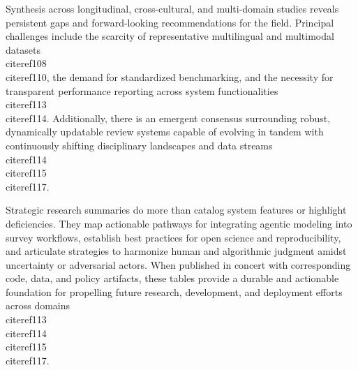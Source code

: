 \documentclass[11pt]{article}
\begin{document}
Synthesis across longitudinal, cross-cultural, and multi-domain studies reveals persistent gaps and forward-looking recommendations for the field. Principal challenges include the scarcity of representative multilingual and multimodal datasets~\\cite{ref108}\\cite{ref110}, the demand for standardized benchmarking, and the necessity for transparent performance reporting across system functionalities~\\cite{ref113}\\cite{ref114}. Additionally, there is an emergent consensus surrounding robust, dynamically updatable review systems capable of evolving in tandem with continuously shifting disciplinary landscapes and data streams~\\cite{ref114}\\cite{ref115}\\cite{ref117}.

Strategic research summaries do more than catalog system features or highlight deficiencies. They map actionable pathways for integrating agentic modeling into survey workflows, establish best practices for open science and reproducibility, and articulate strategies to harmonize human and algorithmic judgment amidst uncertainty or adversarial actors. When published in concert with corresponding code, data, and policy artifacts, these tables provide a durable and actionable foundation for propelling future research, development, and deployment efforts across domains~\\cite{ref113}\\cite{ref114}\\cite{ref115}\\cite{ref117}.
\end{document}
